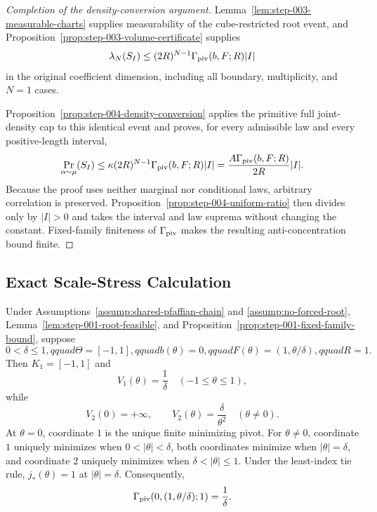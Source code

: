 \begin{proof}[Completion of the density-conversion argument]
Lemma~\ref{lem:step-003-measurable-charts} supplies measurability of the
cube-restricted root event, and
Proposition~\ref{prop:step-003-volume-certificate} supplies
\[
\lambda_N(S_I)
\leq(2R)^{N-1}\Gamma_{\rm piv}(b,F;R)|I|
\]
in the original coefficient dimension, including all boundary,
multiplicity, and $N=1$ cases.

Proposition~\ref{prop:step-004-density-conversion} applies the primitive
full joint-density cap to this identical event and proves, for every
admissible law and every positive-length interval,
\[
\Pr_{\alpha\sim\mu}(S_I)
\leq\kappa(2R)^{N-1}\Gamma_{\rm piv}(b,F;R)|I|
=\frac{A\Gamma_{\rm piv}(b,F;R)}{2R}|I|.
\]
Because the proof uses neither marginal nor conditional laws, arbitrary
correlation is preserved.  Proposition~\ref{prop:step-004-uniform-ratio}
then divides only by $|I|>0$ and takes the interval and law suprema without
changing the constant.  Fixed-family finiteness of $\Gamma_{\rm piv}$ makes
the resulting anti-concentration bound finite.
\end{proof}

\subsection{Exact Scale-Stress Calculation}
\label{app:step-005}

\begin{proposition}
\label{prop:step-005-pivot-profile}
Under Assumptions~\ref{assump:shared-pfaffian-chain} and
\ref{assump:no-forced-root}, Lemma~\ref{lem:step-001-root-feasible}, and
Proposition~\ref{prop:step-001-fixed-family-bound}, suppose
\[
0<\delta\leq1,qquad
\Theta=[-1,1],qquad b(\theta)=0,qquad
F(\theta)=(1,\theta/\delta),qquad R=1.
\]
Then $K_1=[-1,1]$ and
\begin{equation}
V_1(\theta)=\frac1\delta
\quad(-1\leq\theta\leq1),
\label{eq:step-005-v1}
\end{equation}
while
\begin{equation}
V_2(0)=+\infty,
\qquad
V_2(\theta)=\frac\delta{\theta^2}
\quad(\theta\neq0).
\label{eq:step-005-v2}
\end{equation}
At $\theta=0$, coordinate $1$ is the unique finite minimizing pivot.  For
$\theta\neq0$, coordinate $1$ uniquely minimizes when
$0<|\theta|<\delta$, both coordinates minimize when
$|\theta|=\delta$, and coordinate $2$ uniquely minimizes when
$\delta<|\theta|\leq1$.  Under the least-index tie rule,
$j_*(\theta)=1$ at $|\theta|=\delta$.  Consequently,
\begin{equation}
\Gamma_{\rm piv}(0,(1,\theta/\delta);1)=\frac1\delta.
\label{eq:step-005-exact-gamma}
\end{equation}
\end{proposition}

